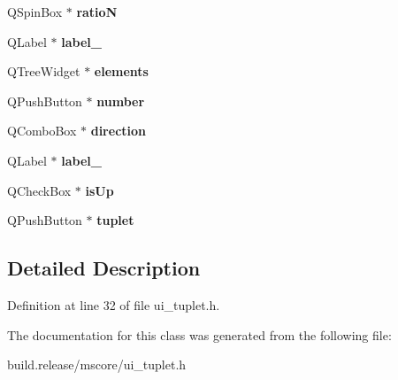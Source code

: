 \begin{DoxyCompactItemize}
\mbox{\label{class_ui___tuplet_base_a4ca8a9a35180a6ec33280c5f61bacd62}} 
Q\+Spin\+Box $\ast$ {\bfseries ratioN}
\item 
\mbox{\label{class_ui___tuplet_base_a142c65d927b9c5a44eec760a506bbd4f}} 
Q\+Label $\ast$ {\bfseries label\+\_}
\item 
\mbox{\label{class_ui___tuplet_base_a434dc96ff9f6add6837d87fdf60a1904}} 
Q\+Tree\+Widget $\ast$ {\bfseries elements}
\item 
\mbox{\label{class_ui___tuplet_base_afc196ffee714c90dbad3fe9b3cd183a9}} 
Q\+Push\+Button $\ast$ {\bfseries number}
\item 
\mbox{\label{class_ui___tuplet_base_a48e2ed8c61a100b6bc3adb58dc7c7a52}} 
Q\+Combo\+Box $\ast$ {\bfseries direction}
\item 
\mbox{\label{class_ui___tuplet_base_a3ad0419c65b5d0de2ffe816b8f071988}} 
Q\+Label $\ast$ {\bfseries label\+\_}
\item 
\mbox{\label{class_ui___tuplet_base_aa3a1731b48e00253681c884ecb98d235}} 
Q\+Check\+Box $\ast$ {\bfseries is\+Up}
\item 
\mbox{\label{class_ui___tuplet_base_aefd19031e56ef712c854a60c57b9fc7e}} 
Q\+Push\+Button $\ast$ {\bfseries tuplet}
\end{DoxyCompactItemize}


\subsection{Detailed Description}


Definition at line 32 of file ui\+\_\+tuplet.\+h.



The documentation for this class was generated from the following file\+:\begin{DoxyCompactItemize}
\item 
build.\+release/mscore/ui\+\_\+tuplet.\+h\end{DoxyCompactItemize}
